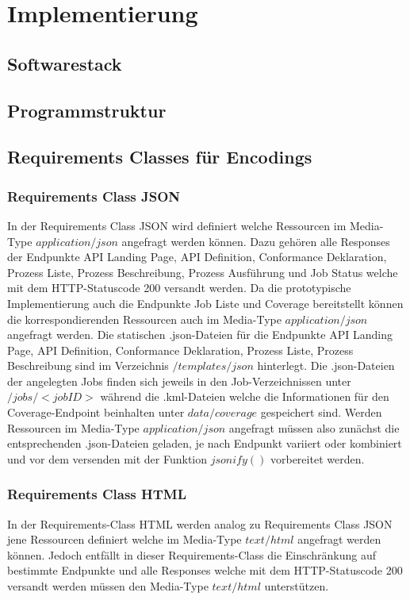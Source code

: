 \newpage
\restoregeometry
\section{Implementierung}
\subsection{Softwarestack}
\subsection{Programmstruktur}
\subsection{Requirements Classes für Encodings}
\subsubsection{Requirements Class JSON}
In der Requirements Class JSON wird definiert welche Ressourcen im Media-Type $application/json$ angefragt werden können. Dazu gehören alle Responses der 
Endpunkte API Landing Page, API Definition, Conformance Deklaration, Prozess Liste, Prozess Beschreibung, Prozess Ausführung und Job Status welche mit dem 
HTTP-Statuscode 200 versandt werden. Da die prototypische Implementierung auch die Endpunkte Job Liste und Coverage bereitstellt können die korrespondierenden
Ressourcen auch im Media-Type $application/json$ angefragt werden.
Die statischen .json-Dateien für die Endpunkte API Landing Page, API Definition, Conformance Deklaration, Prozess Liste, Prozess Beschreibung sind im Verzeichnis
$/templates/json$ hinterlegt. Die .json-Dateien der angelegten Jobs finden sich jeweils in den Job-Verzeichnissen unter $/jobs/<jobID>$ während die .kml-Dateien
welche die Informationen für den Coverage-Endpoint beinhalten unter $data/coverage$ gespeichert sind. Werden Ressourcen im Media-Type $application/json$ angefragt
müssen also zunächst die entsprechenden .json-Dateien geladen, je nach Endpunkt variiert oder kombiniert und vor dem versenden mit der Funktion $jsonify()$
vorbereitet werden. 

\subsubsection{Requirements Class HTML}
In der Requirements-Class HTML werden analog zu Requirements Class JSON jene Ressourcen definiert welche im Media-Type $text/html$ angefragt werden können. Jedoch
entfällt in dieser Requirements-Class die Einschränkung auf bestimmte Endpunkte und alle Responses welche mit dem HTTP-Statuscode 200 versandt werden müssen den 
Media-Type $text/html$ unterstützen. 

